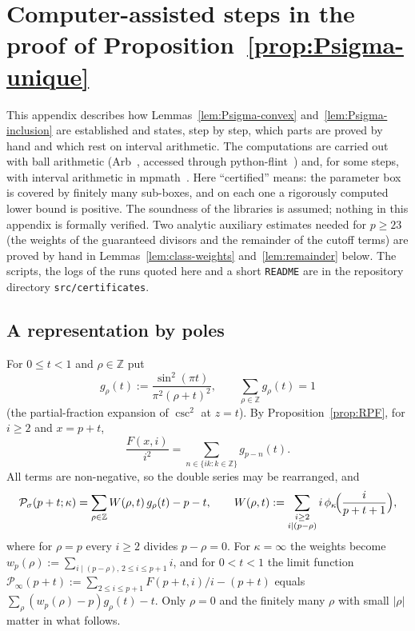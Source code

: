 
\section{Computer-assisted steps in the proof of Proposition~\ref{prop:Psigma-unique}}\label{app:certificates}

This appendix describes how Lemmas~\ref{lem:Psigma-convex} and~\ref{lem:Psigma-inclusion} are established and states, step by step, which parts are proved by hand and which rest on interval arithmetic. The computations are carried out with ball arithmetic (Arb~\cite{johansson2017arb}, accessed through python-flint~\cite{pythonflint}) and, for some steps, with interval arithmetic in mpmath~\cite{mpmath}. Here ``certified'' means: the parameter box is covered by finitely many sub-boxes, and on each one a rigorously computed lower bound is positive. The soundness of the libraries is assumed; nothing in this appendix is formally verified. Two analytic auxiliary estimates needed for $p\ge23$ (the weights of the guaranteed divisors and the remainder of the cutoff terms) are proved by hand in Lemmas~\ref{lem:class-weights} and~\ref{lem:remainder} below. The scripts, the logs of the runs quoted here and a short \texttt{README} are in the repository directory \texttt{src/certificates}.

\subsection{A representation by poles}
For $0\le t<1$ and $\rho\in\mathbb Z$ put
\[
g_\rho(t):=\frac{\sin^2(\pi t)}{\pi^2(\rho+t)^2},\qquad \sum_{\rho\in\mathbb Z}g_\rho(t)=1
\]
(the partial-fraction expansion of $\csc^2$ at $z=t$). By Proposition~\ref{prop:RPF}, for $i\ge2$ and $x=p+t$,
\[
\frac{F(x,i)}{i^2}=\sum_{n\in\{ik:k\in\mathbb Z\}}g_{p-n}(t).
\]
All terms are non-negative, so the double series may be rearranged, and
\begin{equation}\label{eq:pole-rep}
\mathcal P_\sigma(p+t;\kappa)=\sum_{\rho\in\mathbb Z}W(\rho,t)\,g_\rho(t)-p-t,\qquad
W(\rho,t):=\sum_{\substack{i\ge2\\ i\mid(p-\rho)}}i\,\phi_\kappa\!\Bigl(\frac{i}{p+t+1}\Bigr),
\end{equation}
where for $\rho=p$ every $i\ge2$ divides $p-\rho=0$. For $\kappa=\infty$ the weights become $w_p(\rho):=\sum_{i\mid(p-\rho),\,2\le i\le p+1}i$, and for $0<t<1$ the limit function $\mathcal P_\infty(p+t):=\sum_{2\le i\le p+1}F(p+t,i)/i-(p+t)$ equals $\sum_\rho(w_p(\rho)-p)g_\rho(t)-t$. Only $\rho=0$ and the finitely many $\rho$ with small $|\rho|$ matter in what follows.

